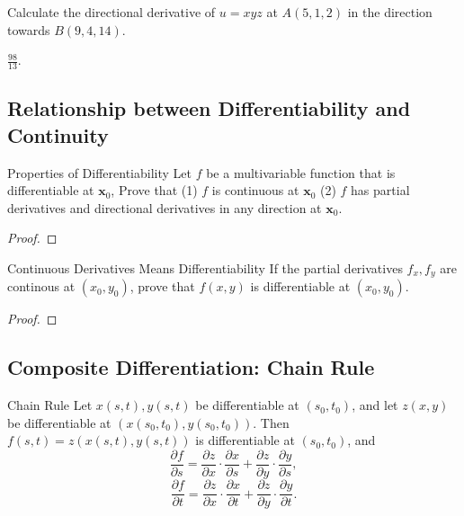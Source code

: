 \begin{example}{}{}
  Calculate the directional derivative of $u = xyz$
  at $A(5,1,2)$ in the direction towards $B(9,4,14)$.
\end{example}

\begin{solution}
  $\frac{98}{13}$.
\end{solution}

\subsection{Relationship between Differentiability and Continuity}

\begin{example}{Properties of Differentiability}{}
  Let $f$ be a multivariable function that is differentiable at $\mathbf{x}_0$,
  Prove that (1) $f$ is continuous at $\mathbf{x}_0$
  (2) $f$ has partial derivatives and directional derivatives in any direction
  at $\mathbf{x}_0$.
\end{example}

\begin{proof}
  
\end{proof}

\begin{example}{Continuous Derivatives Means Differentiability}{}
  If the partial derivatives $f_x, f_y$ are continous at $(x_0, y_0)$,
  prove that $f(x,y)$ is differentiable at $(x_0, y_0)$.
\end{example}

\begin{proof}
  
\end{proof}

\subsection{Composite Differentiation: Chain Rule}

\begin{theorem}{Chain Rule}{}
  Let $x(s,t), y(s,t)$ be differentiable at $(s_0, t_0)$,
  and let $z(x, y)$ be differentiable at $(x(s_0, t_0), y(s_0,t_0))$.
  Then $f(s,t) = z(x(s,t), y(s,t))$ is differentiable at $(s_0,t_0)$, and
  \begin{equation}
    \frac{\partial f}{\partial s} = \frac{\partial z}{\partial x} \cdot \frac{\partial x}{\partial s} + \frac{\partial z}{\partial y} \cdot \frac{\partial y}{\partial s},
  \end{equation}
  \begin{equation}
    \frac{\partial f}{\partial t} = \frac{\partial z}{\partial x} \cdot \frac{\partial x}{\partial t} + \frac{\partial z}{\partial y} \cdot \frac{\partial y}{\partial t}.
  \end{equation}
\end{theorem}

